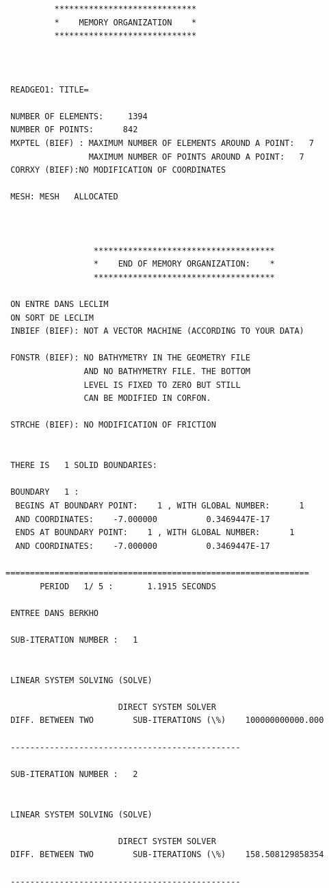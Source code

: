 \begin{verbatim}
          *****************************
          *    MEMORY ORGANIZATION    *
          *****************************



 READGEO1: TITLE=

 NUMBER OF ELEMENTS:     1394
 NUMBER OF POINTS:      842
 MXPTEL (BIEF) : MAXIMUM NUMBER OF ELEMENTS AROUND A POINT:   7
                 MAXIMUM NUMBER OF POINTS AROUND A POINT:   7
 CORRXY (BIEF):NO MODIFICATION OF COORDINATES

 MESH: MESH   ALLOCATED



                  *************************************
                  *    END OF MEMORY ORGANIZATION:    *
                  *************************************

 ON ENTRE DANS LECLIM
 ON SORT DE LECLIM
 INBIEF (BIEF): NOT A VECTOR MACHINE (ACCORDING TO YOUR DATA)

 FONSTR (BIEF): NO BATHYMETRY IN THE GEOMETRY FILE
                AND NO BATHYMETRY FILE. THE BOTTOM
                LEVEL IS FIXED TO ZERO BUT STILL
                CAN BE MODIFIED IN CORFON.

 STRCHE (BIEF): NO MODIFICATION OF FRICTION


 THERE IS   1 SOLID BOUNDARIES:

 BOUNDARY   1 :
  BEGINS AT BOUNDARY POINT:    1 , WITH GLOBAL NUMBER:      1
  AND COORDINATES:    -7.000000          0.3469447E-17
  ENDS AT BOUNDARY POINT:    1 , WITH GLOBAL NUMBER:      1
  AND COORDINATES:    -7.000000          0.3469447E-17

==============================================================
       PERIOD   1/ 5 :       1.1915 SECONDS

 ENTREE DANS BERKHO

 SUB-ITERATION NUMBER :   1


 LINEAR SYSTEM SOLVING (SOLVE)

                       DIRECT SYSTEM SOLVER
 DIFF. BETWEEN TWO        SUB-ITERATIONS (\%)    100000000000.000

 -----------------------------------------------

 SUB-ITERATION NUMBER :   2


 LINEAR SYSTEM SOLVING (SOLVE)

                       DIRECT SYSTEM SOLVER
 DIFF. BETWEEN TWO        SUB-ITERATIONS (\%)    158.508129858354

 -----------------------------------------------


\end{verbatim}
